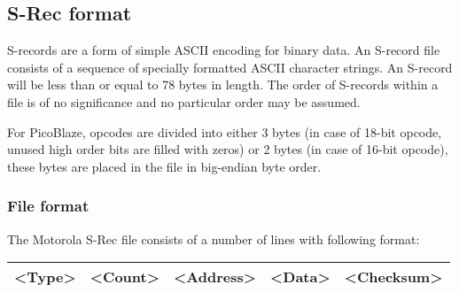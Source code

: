     \clearpage
    \subsection{S-Rec format}
        S-records are a form of simple ASCII encoding for binary data. An S-record file consists of a sequence of specially formatted ASCII character strings. An S-record will be less than or equal to 78 bytes in length. The order of S-records within a file is of no significance and no particular order may be assumed.

        For PicoBlaze, opcodes are divided into either 3 bytes (in case of 18-bit opcode, unused high order bits are filled with zeros) or 2 bytes (in case of 16-bit opcode), these bytes are placed in the file in big-endian byte order.

        \subsubsection{File format}
            The Motorola S-Rec file consists of a number of lines with following format:

            \begin{tabular}{|ccccc|}
                \hline
                <Type> & <Count> & <Address> & <Data> & <Checksum> \\\hline
            \end{tabular}

